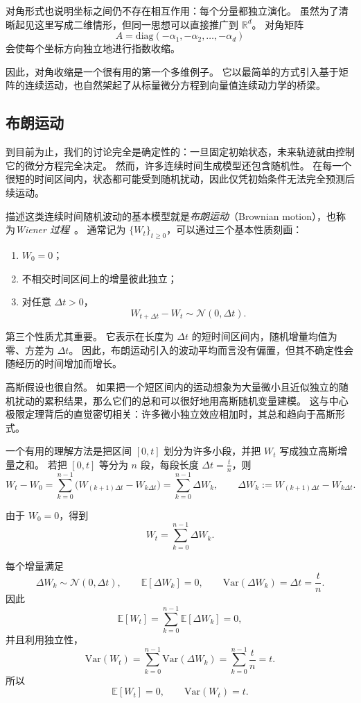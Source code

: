 对角形式也说明坐标之间仍不存在相互作用：每个分量都独立演化。
虽然为了清晰起见这里写成二维情形，但同一思想可以直接推广到 $\mathbb{R}^d$。
对角矩阵
\[
A=\mathrm{diag}(-\alpha_1,-\alpha_2,\dots,-\alpha_d)
\]
会使每个坐标方向独立地进行指数收缩。

因此，对角收缩是一个很有用的第一个多维例子。
它以最简单的方式引入基于矩阵的连续运动，也自然架起了从标量微分方程到向量值连续动力学的桥梁。

\subsection{布朗运动}

到目前为止，我们的讨论完全是确定性的：一旦固定初始状态，未来轨迹就由控制它的微分方程完全决定。
然而，许多连续时间生成模型还包含随机性。
在每一个很短的时间区间内，状态都可能受到随机扰动，因此仅凭初始条件无法完全预测后续运动。

描述这类连续时间随机波动的基本模型就是\emph{布朗运动}（Brownian motion），也称为\emph{Wiener 过程}~\cite{oksendal2003sde}。
通常记为 $\{W_t\}_{t\ge 0}$，可以通过三个基本性质刻画：
\begin{enumerate}
    \item $W_0=0$；
    \item 不相交时间区间上的增量彼此独立；
    \item 对任意 $\Delta t>0$，
    \[
    W_{t+\Delta t}-W_t \sim \mathcal{N}(0,\Delta t).
    \]
\end{enumerate}

第三个性质尤其重要。
它表示在长度为 $\Delta t$ 的短时间区间内，随机增量均值为零、方差为 $\Delta t$。
因此，布朗运动引入的波动平均而言没有偏置，但其不确定性会随经历的时间增加而增长。

高斯假设也很自然。
如果把一个短区间内的运动想象为大量微小且近似独立的随机扰动的累积结果，那么它们的总和可以很好地用高斯随机变量建模。
这与中心极限定理背后的直觉密切相关：许多微小独立效应相加时，其总和趋向于高斯形式。

一个有用的理解方法是把区间 $[0,t]$ 划分为许多小段，并把 $W_t$ 写成独立高斯增量之和。
若把 $[0,t]$ 等分为 $n$ 段，每段长度
$\Delta t=\frac{t}{n}$，则
\[
W_t-W_0
=
\sum_{k=0}^{n-1}\bigl(W_{(k+1)\Delta t}-W_{k\Delta t}\bigr)
=
\sum_{k=0}^{n-1}\Delta W_k,
\qquad
\Delta W_k:=W_{(k+1)\Delta t}-W_{k\Delta t}.
\]

由于 $W_0=0$，得到
\[
W_t=\sum_{k=0}^{n-1}\Delta W_k.
\]

\begin{tcolorbox}[
  colback=blue!4,
  colframe=blue!50!black,
  title={时刻 $t$ 的布朗运动均值与方差},
  boxrule=0.6pt,
  arc=2mm,
  left=2mm,
  right=2mm,
  top=1mm,
  bottom=1mm
]
每个增量满足
\[
\Delta W_k\sim \mathcal{N}(0,\Delta t),
\qquad
\mathbb{E}[\Delta W_k]=0,
\qquad
\mathrm{Var}(\Delta W_k)=\Delta t=\frac{t}{n}.
\]
因此
\[
\mathbb{E}[W_t]
=
\sum_{k=0}^{n-1}\mathbb{E}[\Delta W_k]
=
0,
\]
并且利用独立性，
\[
\mathrm{Var}(W_t)
=
\sum_{k=0}^{n-1}\mathrm{Var}(\Delta W_k)
=
\sum_{k=0}^{n-1}\frac{t}{n}
=
t.
\]
所以
\[
\mathbb{E}[W_t]=0,
\qquad
\mathrm{Var}(W_t)=t.
\]
\end{tcolorbox}

